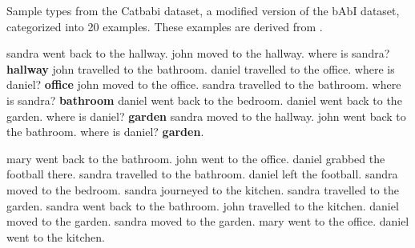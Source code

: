  
  

  \begin{table}[htb!]  
    \centering  
    \caption{Sample types from the Catbabi \cite{schlag2020learning} dataset, a modified version of the bAbI dataset, categorized into 20 examples. These examples are derived from \cite{weston2015towards}.}  
    \label{tab:catbabi examples} 
\begin{tcbraster}[raster columns=2, size=minimal, raster valign=top]  
    \begin{tcolorbox}[mybox, title=Task 1: Single supporting fact]

    \label{tab: catbabi}
    \tiny  
        sandra went back to the hallway. john moved to the hallway. where is sandra? \textbf{hallway} john travelled to the bathroom. daniel travelled to the office. where is daniel? \textbf{office} john moved to the office. sandra travelled to the bathroom. where is sandra? \textbf{bathroom} daniel went back to the bedroom. daniel went back to the garden. where is daniel? \textbf{garden} sandra moved to the hallway. john went back to the bathroom. where is daniel? \textbf{garden}.  
    \end{tcolorbox}  
    \begin{tcolorbox}[mybox, title=Task 2: Two supporting fact]  
    \tiny  
    mary went back to the bathroom. john went to the office. daniel grabbed the football there. sandra travelled to the bathroom. daniel left the football. sandra moved to the bedroom. sandra journeyed to the kitchen. sandra travelled to the garden. sandra went back to the bathroom. john travelled to the kitchen. daniel moved to the garden. sandra moved to the garden. mary went to the office. daniel went to the kitchen. 
    \end{tcolorbox}  


\end{tcbraster}
\end{table}
